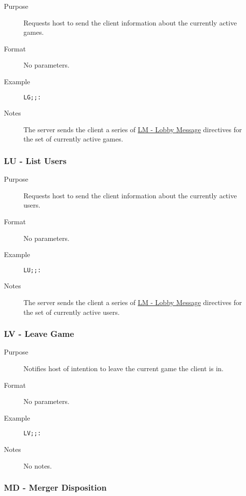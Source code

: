 \documentclass{article}
\providecommand{\wiredata}[1]{\texttt{{#1}}}
\begin{document}
\begin{description}
  \item[Purpose] Requests host to send the client information about the currently active games.
  \item[Format] No parameters.
  \item[Example] \wiredata{LG;;:}
  \item[Notes] The server sends the client a series of \hyperref[ssub:lm_lobby_message]{LM - Lobby Message} directives for the set of currently active games.
\end{description}


\subsubsection{LU - List Users} %
\label{ssub:lu_list_users}

\begin{description}
  \item[Purpose] Requests host to send the client information about the currently active users.
  \item[Format] No parameters.
  \item[Example] \wiredata{LU;;:}
  \item[Notes] The server sends the client a series of \hyperref[ssub:lm_lobby_message]{LM - Lobby Message} directives for the set of currently active users.
\end{description}


\subsubsection{LV - Leave Game} %
\label{ssub:lv_leave_game}

\begin{description}
  \item[Purpose] Notifies host of intention to leave the current game the client is in.
  \item[Format] No parameters.
  \item[Example] \wiredata{LV;;:}
  \item[Notes] No notes.
\end{description}


\subsubsection{MD - Merger Disposition} %
\label{ssub:md_merger_disposition}
\end{document}
